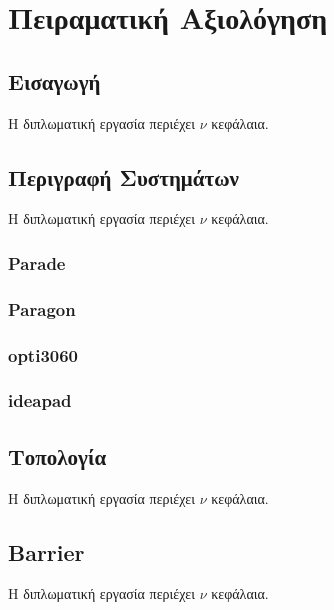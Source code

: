 \chapter{Πειραματική Αξιολόγηση}
\label{ch:Experimental Evaluation}

\section{Εισαγωγή}
\label{sec:Introduction}
Η διπλωματική εργασία περιέχει $\nu$ κεφάλαια.

\section{Περιγραφή Συστημάτων}
\label{sec:Systems Description}
Η διπλωματική εργασία περιέχει $\nu$ κεφάλαια.

\subsection{Parade}

\subsection{Paragon}

\subsection{opti3060}

\subsection{ideapad}


\section{Τοπολογία}
\label{sec:Topology}
Η διπλωματική εργασία περιέχει $\nu$ κεφάλαια.

\section{Barrier}
\label{sec:Barrier}
Η διπλωματική εργασία περιέχει $\nu$ κεφάλαια.
